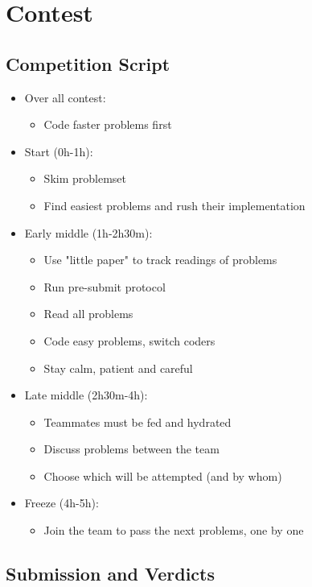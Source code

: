 \chapter{Contest}

\section{Competition Script}
\begin{itemize}
	\item Over all contest:
	\begin{itemize}
		\item Code faster problems first
	\end{itemize}
	\item Start (0h-1h):
	\begin{itemize}
		\item Skim problemset
		\item Find easiest problems and rush their implementation
	\end{itemize}
	\item Early middle (1h-2h30m):
	\begin{itemize}
		\item Use "little paper" to track readings of problems
		\item Run pre-submit protocol
		\item Read all problems
		\item Code easy problems, switch coders
		\item Stay calm, patient and careful
	\end{itemize}
	\item Late middle (2h30m-4h):
	\begin{itemize}
		\item Teammates must be fed and hydrated
		\item Discuss problems between the team
		\item Choose which will be attempted (and by whom)
	\end{itemize}
	\item Freeze (4h-5h):
	\begin{itemize}
		\item Join the team to pass the next problems, one by one
	\end{itemize}
\end{itemize}

\section{Submission and Verdicts}

